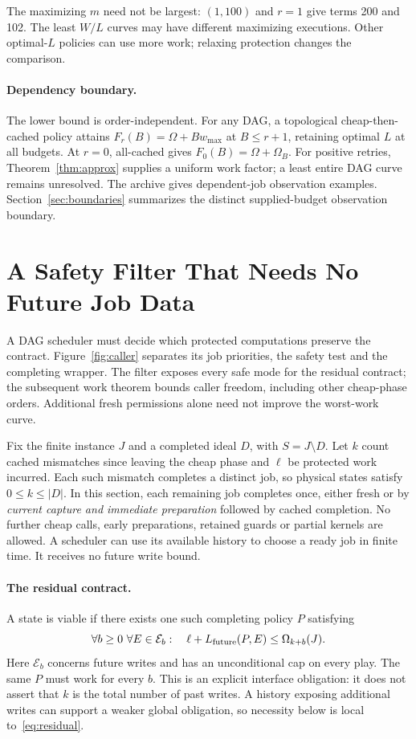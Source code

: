 \documentclass[acmsmall,screen,review,anonymous]{acmart}
\begin{document}
The maximizing $m$ need not be largest: $(1,100)$ and $r=1$ give terms 200 and 102. The least $W/L$ curves may have different maximizing executions. Other optimal-$L$ policies can use more work; relaxing protection changes the comparison.

\paragraph{Dependency boundary.}
The lower bound is order-independent. For any DAG, a topological cheap-then-cached policy attains $F_r(B)=\Omega+B w_{\max}$ at $B\le r+1$, retaining optimal $L$ at all budgets. At $r=0$, all-cached gives $F_0(B)=\Omega+\Omega_B$. For positive retries, Theorem~\ref{thm:approx} supplies a uniform work factor; a least entire DAG curve remains unresolved. The archive gives dependent-job observation examples. Section~\ref{sec:boundaries} summarizes the distinct supplied-budget observation boundary.

\section{A Safety Filter That Needs No Future Job Data}
\label{sec:residual}

A DAG scheduler must decide which protected computations preserve the contract. Figure~\ref{fig:caller} separates its job priorities, the safety test and the completing wrapper. The filter exposes every safe mode for the residual contract; the subsequent work theorem bounds caller freedom, including other cheap-phase orders. Additional fresh permissions alone need not improve the worst-work curve.

Fix the finite instance $J$ and a completed ideal $D$, with $S=J\setminus D$. Let $k$ count cached mismatches since leaving the cheap phase and $\ell$ be protected work incurred. Each such mismatch completes a distinct job, so physical states satisfy $0\le k\le|D|$. In this section, each remaining job completes once, either fresh or by \emph{current capture and immediate preparation} followed by cached completion. No further cheap calls, early preparations, retained guards or partial kernels are allowed. A scheduler can use its available history to choose a ready job in finite time. It receives no future write bound.

\paragraph{The residual contract.}
A state is viable if there exists one such completing policy $P$ satisfying
\begin{equation}
 \forall b\ge0\ \forall E\in\mathcal E_b:
 \quad \ell+L_{\rm future}(P,E)\le\Omega_{k+b}(J).
 \label{eq:residual}
\end{equation}
Here $\mathcal E_b$ concerns future writes and has an unconditional cap on every play. The same $P$ must work for every $b$. This is an explicit interface obligation: it does not assert that $k$ is the total number of past writes. A history exposing additional writes can support a weaker global obligation, so necessity below is local to~\eqref{eq:residual}.
\end{document}
